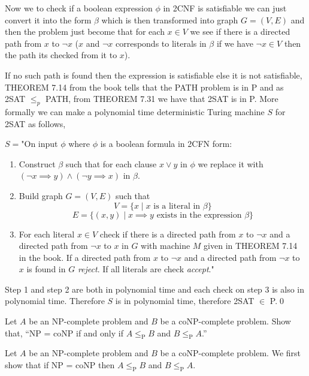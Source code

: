 \documentclass[addpoints]{exam}
\begin{document}
\begin{questions}
\begin{solution}
        Now we to check if a boolean expression $\phi$ in 2CNF is satisfiable we can just convert it into the form $\beta$ which is then transformed into graph $G = (V,E)$ and then the problem just become that for each $x\in V$ we see if there is a directed path from $x$ to $\neg x$ ($x$ and $\neg x$ corresponds to literals in $\beta$ if we have $\neg x\in V$ then the path its checked from it to $x$).
        
        If no such path is found then the expression is satisfiable else it is not satisfiable, THEOREM 7.14 from the book tells that the PATH problem is in P and as 2SAT $\leq_p$ PATH, from THEOREM 7.31 we have that 2SAT is in P. More formally we can make a polynomial time deterministic Turing machine $S$ for 2SAT as follows,
        
        $S = $"On input $\phi$ where $\phi$ is a boolean formula in 2CFN form:
        \begin{enumerate}
            \item Construct $\beta$ such that for each clause $x \lor y$ in $\phi$ we replace it with \\$(\neg x \implies y) \land (\neg y \implies x)$ in $\beta$.
            \item Build graph $G = (V,E)$ such that \[V = \{x\mid x\text{ is a literal in }\beta\}\] \[E = \{(x,y)\mid x \implies y\text{ exists in the expression }\beta\}\]
            \item For each literal $x\in V$ check if there is a directed path from $x$ to $\neg x$ and a directed path from $\neg x$ to $x$ in $G$ with machine $M$ given in THEOREM 7.14 in the book. If a directed path from $x$ to $\neg x$ and a directed path from $\neg x$ to $x$ is found in $G$ \textit{reject}. If all literals are check \textit{accept}."
        \end{enumerate}
        Step 1 and step 2 are both in polynomial time and each check on step 3 is also in polynomial time. Therefore $S$ is in polynomial time, therefore 2SAT $\in$ P.\hfill\qed
    \end{solution}
    
    \newpage
    
    \question[10] Let $A$ be an NP-complete problem and $B$ be a coNP-complete problem. Show that, ``NP = coNP if and only if $A\leq_\text{P} B$ and $B\leq_\text{P} A$.''
    \begin{solution}
        Let $A$ be an NP-complete problem and $B$ be a coNP-complete problem. We first show that if NP = coNP then $A\leq_\text{P} B$ and $B\leq_\text{P} A$.
        

\end{solution}
\end{questions}
\end{document}

